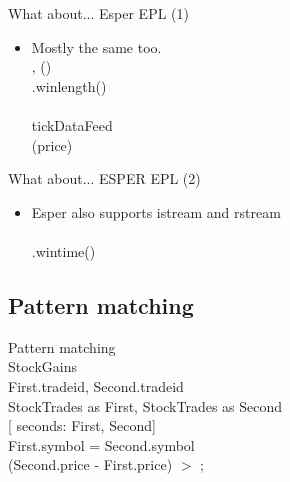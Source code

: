 \documentclass[brown, compress, mathserif]{beamer}
\begin{document}
\begin{frame}{What about... Esper EPL (1)}
  \begin{itemize}
  \item Mostly the same too.
    \bigskip\\
     , ()\\
     \hlsym{(}.win\hlsym{:}length()\\
      \hlsym{$>$} \\
     tickDataFeed\\
     (price) \hlsym{$>$} 

  \end{itemize}
\end{frame}


\begin{frame}{What about... ESPER EPL (2)}
  \begin{itemize}
  \item Esper also supports \alert{istream} and \alert{rstream}
    \bigskip\\
     \hlsym{*}\\
     \hlsym{(}.win\hlsym{:}time()\\
  \end{itemize}
\end{frame}


\subsection{Pattern matching}


\begin{frame}{Pattern matching}
  \hlstd{}\hspace*{\fill}\\
   StockGains\\
   First.tradeid, Second.tradeid\\
    StockTrades as First, StockTrades as Second\\
  [ seconds: First, Second]\\
   First.symbol = Second.symbol\\
  (Second.price - First.price) $>$ ;
\end{frame}
\end{document}
